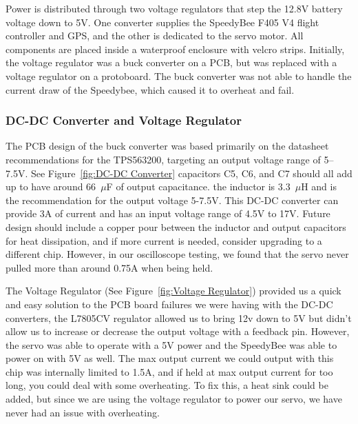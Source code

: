 Power is distributed through two voltage regulators that step the 12.8V battery voltage down to 5V. One converter supplies the SpeedyBee F405 V4 flight controller and GPS, and the other is dedicated to the servo motor. All components are placed inside a waterproof enclosure with velcro strips. Initially, the voltage regulator was a buck converter on a PCB, but was replaced with a voltage regulator on a protoboard. The buck converter was not able to handle the current draw of the Speedybee, which caused it to overheat and fail. 

\subsubsection{DC-DC Converter and Voltage Regulator}
The PCB design of the buck converter was based primarily on the datasheet recommendations for the TPS563200, targeting an output voltage range of 5–7.5V. See Figure~\ref{fig:DC-DC Converter} capacitors C5, C6, and C7 should all add up to have around 66~\(\mu\)F of output capacitance. the inductor is 3.3~\(\mu\)H and is the recommendation for the output voltage 5-7.5V. This DC-DC converter can provide 3A of current and has an input voltage range of 4.5V to 17V. Future design should include a copper pour between the inductor and output capacitors for heat dissipation, and if more current is needed, consider upgrading to a different chip. However, in our oscilloscope testing, we found that the servo never pulled more than around 0.75A when being held. 

The Voltage Regulator (See Figure~\ref{fig:Voltage Regulator}) provided us a quick and easy solution to the PCB board failures we were having with the DC-DC converters, the L7805CV regulator allowed us to bring 12v down to 5V but didn't allow us to increase or decrease the output voltage with a feedback pin. However, the servo was able to operate with a 5V power and the SpeedyBee was able to power on with 5V as well. The max output current we could output with this chip was internally limited to 1.5A, and if held at max output current for too long, you could deal with some overheating. To fix this, a heat sink could be added, but since we are using the voltage regulator to power our servo, we have never had an issue with overheating.


